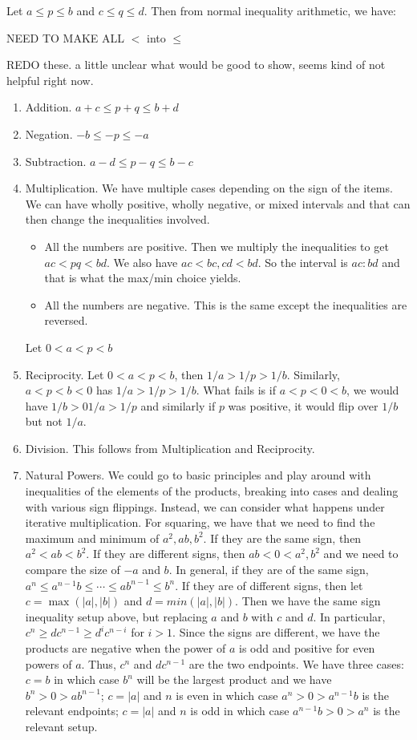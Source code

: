 \documentclass[12pt]{article}
\theoremstyle{remark}
\begin{document}
Let $a \leq p \leq b$ and $c\leq  q \leq  d$. Then from normal inequality arithmetic, we have: 

NEED TO MAKE ALL $<$ into $\leq$

REDO these. a little unclear what would be good to show, seems kind of not helpful right now. 

\begin{enumerate}
    \item Addition.   $a +c \leq  p + q \leq  b +d$
    \item Negation.  $-b \leq -p \leq -a$
    \item Subtraction.  $a - d \leq p-q \leq b -c$
    \item Multiplication. We have multiple cases depending on the sign of the items. We can have wholly positive, wholly negative, or mixed intervals and that can then change the inequalities involved. 
    \begin{itemize}
        \item All the numbers are positive. Then we multiply the inequalities to get $ac < pq < bd$. We also have $ac < bc, cd  < bd$. So the interval is $ac:bd$ and that is what the max/min choice yields. 
        \item All the numbers are negative. This is the same except the inequalities are reversed. 
    \end{itemize}
    Let $0 < a < p < b$
    \item Reciprocity. Let $0 < a < p < b$, then $1/a > 1/p  > 1/b$. Similarly, $a < p < b< 0$ has $1/a > 1/p > 1/b$. What fails is if $a < p < 0 < b$, we would have $1/b > 0 1/a > 1/p $ and similarly if $p$ was positive, it would flip over $1/b$ but not $1/a$.
    \item Division. This follows from Multiplication and Reciprocity. 
    \item Natural Powers. We could go to basic principles and play around with inequalities of the elements of the products, breaking into cases and dealing with various sign flippings. Instead, we can consider what happens under iterative multiplication. For squaring, we have that we need to find the maximum and minimum of $a^2, ab, b^2$. If they are the same sign, then $a^2 < ab < b^2$. If they are different signs, then $ab < 0 < a^2, b^2$ and we need to compare the size of $-a$ and $b$.  In general, if they are of the same sign, $a^n \leq a^{n-1} b \leq \cdots \leq ab^{n-1} \leq b^n$. If they are of different signs, then let $c = \max( |a|, |b|)$ and $d=min(|a|, |b|)$. Then we have the same sign inequality setup above, but replacing $a$ and $b$ with $c$ and $d$. In particular,  $c^n \geq d c^{n-1} \geq d^{i}c^{n-i}$  for $i > 1$.  Since the signs are different, we have the products are negative when the power of $a$ is odd and positive for even powers of $a$. Thus, $c^n$ and $d c^{n-1}$ are the two endpoints. We have three cases: $c=b$ in which case $b^n$ will be the largest product and we have $b^n > 0 > ab^{n-1}$; $c=|a|$ and $n$ is even in which case $a^n > 0 > a^{n-1} b$ is the relevant endpoints; $c=|a|$ and $n$ is odd in which case $a^{n-1} b > 0 > a^n$ is the relevant setup.  


\end{enumerate}
\end{document}
